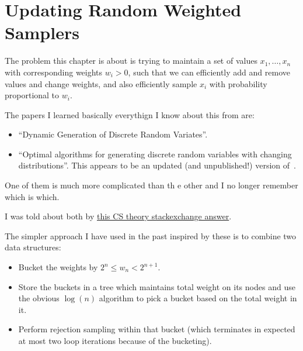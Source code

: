 \chapter{Updating Random Weighted Samplers}

The problem this chapter is about is trying to maintain a set of values \(x_1, \ldots, x_n\) with corresponding weights \(w_i > 0\),
such that we can efficiently add and remove values and change weights, and also efficiently sample \(x_i\) with probability proportional to \(w_i\).

The papers I learned basically everythign I know about this from are:

\begin{itemize}
\item ``Dynamic Generation of Discrete Random Variates''\cite{DBLP:journals/mst/MatiasVN03}.
\item ``Optimal algorithms for generating discrete random variables with changing distributions''\cite{hagerup1993optimal}.
This appears to be an updated (and unpublished!) version of~\cite{DBLP:conf/icalp/HagerupMM93}.
\end{itemize}

One of them is much more complicated than th e other and I no longer remember which is which.

I was told about both by \href{https://cstheory.stackexchange.com/a/37651/4624}{this CS theory stackexchange answer}.

The simpler approach I have used in the past inspired by these is to combine two data structures:

\begin{itemize}
\item Bucket the weights by \(2^n \leq w_n < 2^{n + 1}\).
\item Store the buckets in a tree which maintains total weight on its nodes and use the obvious \(\log(n)\) algorithm to pick a bucket based on the total weight in it.
\item Perform rejection sampling within that bucket (which terminates in expected at most two loop iterations because of the bucketing).
\end{itemize}
